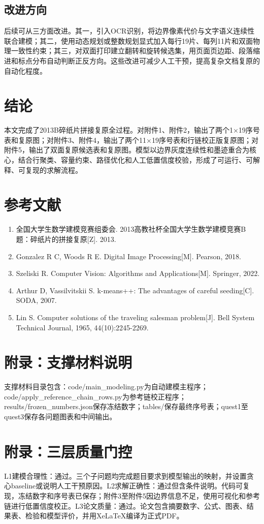 \documentclass[UTF8,a4paper,12pt]{ctexart}
\begin{document}
\subsection{改进方向}
后续可从三方面改进。其一，引入OCR识别，将边界像素代价与文字语义连续性联合建模；其二，使用动态规划或整数规划显式加入每行19片、每列11片和双面物理一致性约束；其三，对双面打印建立翻转和旋转候选集，用页面页边距、段落缩进和标点分布自动判断正反方向。这些改进可减少人工干预，提高复杂文档复原的自动化程度。

\section{结论}
本文完成了2013B碎纸片拼接复原全过程。对附件1、附件2，输出了两个1×19序号表和复原图；对附件3、附件4，输出了两个11×19序号表和行链校正版复原图；对附件5，输出了双面复原候选表和复原图。模型以边界灰度连续性和墨迹重合为核心，结合行聚类、容量约束、路径优化和人工低置信度校验，形成了可运行、可解释、可复现的求解流程。

\section{参考文献}
\begin{enumerate}
\item 全国大学生数学建模竞赛组委会. 2013高教社杯全国大学生数学建模竞赛B题：碎纸片的拼接复原[Z]. 2013.
\item Gonzalez R C, Woods R E. Digital Image Processing[M]. Pearson, 2018.
\item Szeliski R. Computer Vision: Algorithms and Applications[M]. Springer, 2022.
\item Arthur D, Vassilvitskii S. k-means++: The advantages of careful seeding[C]. SODA, 2007.
\item Lin S. Computer solutions of the traveling salesman problem[J]. Bell System Technical Journal, 1965, 44(10):2245-2269.
\end{enumerate}

\appendix
\section{附录：支撑材料说明}
支撑材料目录包含：code/main\_modeling.py为自动建模主程序；code/apply\_reference\_chain\_rows.py为参考链校正程序；results/frozen\_numbers.json保存冻结数字；tables/保存最终序号表；quest1至quest3保存各问题图表和中间输出。

\section{附录：三层质量门控}
L1建模合理性：通过。三个子问题均完成题目要求到模型输出的映射，并设置贪心baseline或说明人工干预原因。L2求解正确性：通过但含条件说明。代码可复现，冻结数字和序号表已保存；附件3至附件5因边界信息不足，使用可视化和参考链进行低置信度校正。L3论文质量：通过。论文包含摘要数字、公式、图表、结果表、检验和模型评价，并用XeLaTeX编译为正式PDF。
\end{document}
